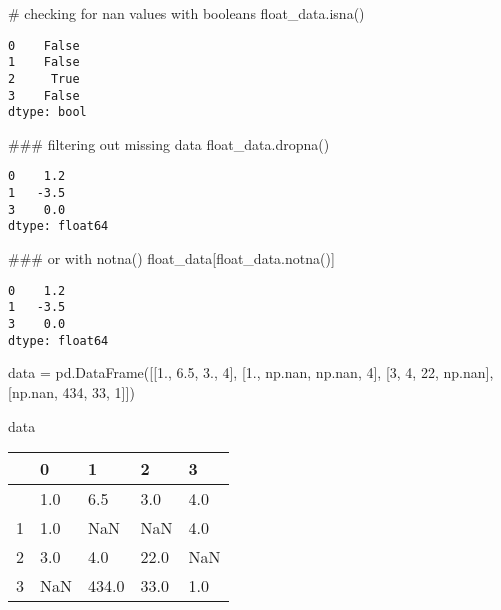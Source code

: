 \documentclass[
  letterpaper,
  DIV=11,
  numbers=noendperiod]{scrreprt}
\newenvironment{Shaded}{\begin{snugshade}}{\end{snugshade}}
\newcommand{\CommentTok}[1]{\textcolor[rgb]{0.37,0.37,0.37}{#1}}
\newcommand{\DecValTok}[1]{\textcolor[rgb]{0.68,0.00,0.00}{#1}}
\newcommand{\FloatTok}[1]{\textcolor[rgb]{0.68,0.00,0.00}{#1}}
\newcommand{\NormalTok}[1]{\textcolor[rgb]{0.00,0.23,0.31}{#1}}
\newcommand{\OperatorTok}[1]{\textcolor[rgb]{0.37,0.37,0.37}{#1}}
\begin{document}
\begin{Shaded}
\begin{Highlighting}[]
\CommentTok{\# checking for nan values with booleans}
\NormalTok{float\_data.isna()}
\end{Highlighting}
\end{Shaded}

\begin{verbatim}
0    False
1    False
2     True
3    False
dtype: bool
\end{verbatim}

\begin{Shaded}
\begin{Highlighting}[]
\CommentTok{\#\#\# filtering out missing data}
\NormalTok{float\_data.dropna()}
\end{Highlighting}
\end{Shaded}

\begin{verbatim}
0    1.2
1   -3.5
3    0.0
dtype: float64
\end{verbatim}

\begin{Shaded}
\begin{Highlighting}[]
\CommentTok{\#\#\# or with notna()}
\NormalTok{float\_data[float\_data.notna()]}
\end{Highlighting}
\end{Shaded}

\begin{verbatim}
0    1.2
1   -3.5
3    0.0
dtype: float64
\end{verbatim}

\begin{Shaded}
\begin{Highlighting}[]
\NormalTok{data }\OperatorTok{=}\NormalTok{ pd.DataFrame([[}\FloatTok{1.}\NormalTok{, }\FloatTok{6.5}\NormalTok{, }\FloatTok{3.}\NormalTok{, }\DecValTok{4}\NormalTok{], }
\NormalTok{                     [}\FloatTok{1.}\NormalTok{, np.nan, np.nan, }\DecValTok{4}\NormalTok{], }
\NormalTok{                     [}\DecValTok{3}\NormalTok{, }\DecValTok{4}\NormalTok{, }\DecValTok{22}\NormalTok{, np.nan],}
\NormalTok{                     [np.nan, }\DecValTok{434}\NormalTok{, }\DecValTok{33}\NormalTok{, }\DecValTok{1}\NormalTok{]])}

\NormalTok{data}
\end{Highlighting}
\end{Shaded}

\begin{longtable}[]{@{}lllll@{}}
\toprule\noalign{}
& 0 & 1 & 2 & 3 \\
\midrule\noalign{}
\endhead
\bottomrule\noalign{}
\endlastfoot
0 & 1.0 & 6.5 & 3.0 & 4.0 \\
1 & 1.0 & NaN & NaN & 4.0 \\
2 & 3.0 & 4.0 & 22.0 & NaN \\
3 & NaN & 434.0 & 33.0 & 1.0 \\
\end{longtable}
\end{document}
